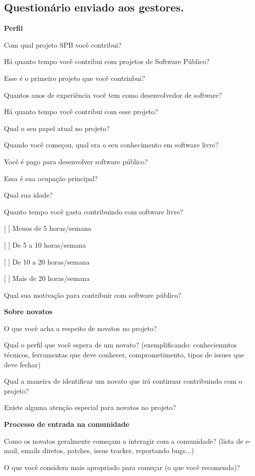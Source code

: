 \begin{anexosenv}
\chapter{Questionário enviado aos gestores.}
\label{anexo e}

\textbf{Perfil}

Com qual projeto SPB você contribui?

Há quanto tempo você contribui com projetos de Software Público?

Esse é o primeiro projeto que você contrinbui?

Quantos anos de experiência você tem como desenvolvedor de software?

Há quanto tempo você contribui com esse projeto?

Qual o seu papel atual no projeto?

Quando você começou, qual era o seu conhecimento em software livre?

Você é pago para desenvolver software público?

Essa é sua ocupação principal?

Qual sua idade?

Quanto tempo você gasta contribuindo com software livre?

[ ] Menos de 5 horas/semana 

[ ] De 5 a 10 horas/semana

[ ] De 10 a 20 horas/semana

[ ] Mais de 20 horas/semana

Qual sua motivação para contribuir com software público?

\textbf{Sobre novatos}

O que você acha a respeito de novatos no projeto?

Qual o perfil que você espera de um novato? (exemplificando: conheciemntos técnicos, 
ferramentas que deve conhecer, comprometimento, tipos de issues que deve fechar)

Qual a maneira de identificar um novato que irá continuar contribuindo com o projeto?

Existe alguma atenção especial para novatos no projeto?

\textbf{Processo de entrada na comunidade}

Como os novatos geralmente começam a interagir com a comunidade? (lista de e-mail, 
emails diretos, patches, issue tracker, reportando bugs...)

O que você considera mais apropriado para começar (o que você recomenda)?


\end{anexosenv}

